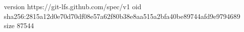 version https://git-lfs.github.com/spec/v1
oid sha256:2815a12d0e70d70df08e57a62f80b38e8aa515a2bfa40be89744afd9e9794689
size 87544
